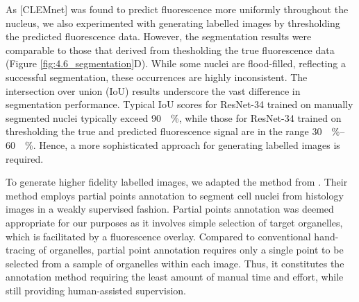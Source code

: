 As [CLEMnet] was found to predict fluorescence more uniformly throughout the nucleus, we also experimented with generating labelled images by thresholding the predicted fluorescence data. However, the segmentation results were comparable to those that derived from thesholding the true fluorescence data (Figure \ref{fig:4.6_segmentation}D). While some nuclei are flood-filled, reflecting a successful segmentation, these occurrences are highly inconsistent. The intersection over union (IoU) results underscore the vast difference in segmentation performance. Typical IoU scores for ResNet-34 trained on manually segmented nuclei typically exceed \SI{90}{\!\percent}, while those for ResNet-34 trained on thresholding the true and predicted fluorescence signal are in the range \SIrange{30}{60}{\!\percent}. Hence, a more sophisticated approach for generating labelled images is required.

To generate higher fidelity labelled images, we adapted the method from \textcite{qu2020weakly}. Their method employs partial points annotation to segment cell nuclei from histology images in a weakly supervised fashion. Partial points annotation was deemed appropriate for our purposes as it involves simple selection of target organelles, which is facilitated by a fluorescence overlay. Compared to conventional hand-tracing of organelles, partial point annotation requires only a single point to be selected from a sample of organelles within each image. Thus, it constitutes the annotation method requiring the least amount of manual time and effort, while still providing human-assisted supervision.

